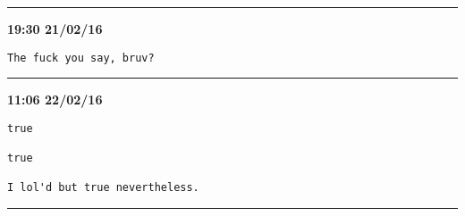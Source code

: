 \hrule%

\begin{adjustwidth}{2cm}{0cm}
\footnotesize \textbf{19:30 21/02/16}

\begin{lstlisting}[breaklines, breakatwhitespace, basicstyle=\small, frame=leftline]
The fuck you say, bruv? 
\end{lstlisting}
\end{adjustwidth}

\hrule%

\begin{adjustwidth}{2cm}{0cm}
\footnotesize \textbf{11:06 22/02/16}

\begin{lstlisting}[breaklines, breakatwhitespace, basicstyle=\small, frame=leftline]
true

true

I lol'd but true nevertheless.
\end{lstlisting}
\end{adjustwidth}

\hrule%


